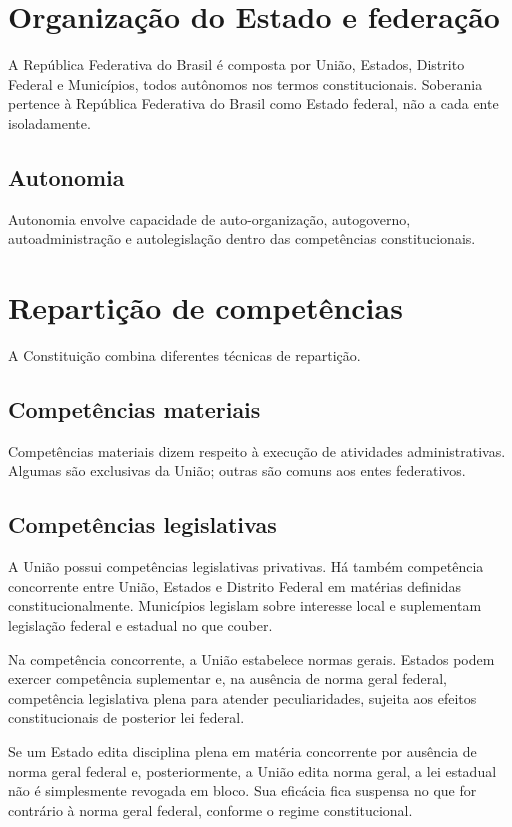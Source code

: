 \section{Organização do Estado e federação}

A República Federativa do Brasil é composta por União, Estados, Distrito Federal e Municípios, todos autônomos nos termos constitucionais. Soberania pertence à República Federativa do Brasil como Estado federal, não a cada ente isoladamente.

\subsection{Autonomia}

Autonomia envolve capacidade de auto-organização, autogoverno, autoadministração e autolegislação dentro das competências constitucionais.

\section{Repartição de competências}

A Constituição combina diferentes técnicas de repartição.

\subsection{Competências materiais}

Competências materiais dizem respeito à execução de atividades administrativas. Algumas são exclusivas da União; outras são comuns aos entes federativos.

\subsection{Competências legislativas}

A União possui competências legislativas privativas. Há também competência concorrente entre União, Estados e Distrito Federal em matérias definidas constitucionalmente. Municípios legislam sobre interesse local e suplementam legislação federal e estadual no que couber.

Na competência concorrente, a União estabelece normas gerais. Estados podem exercer competência suplementar e, na ausência de norma geral federal, competência legislativa plena para atender peculiaridades, sujeita aos efeitos constitucionais de posterior lei federal.

\begin{exemplo}
Se um Estado edita disciplina plena em matéria concorrente por ausência de norma geral federal e, posteriormente, a União edita norma geral, a lei estadual não é simplesmente revogada em bloco. Sua eficácia fica suspensa no que for contrário à norma geral federal, conforme o regime constitucional.
\end{exemplo}

